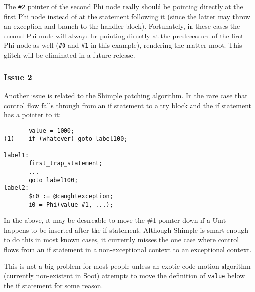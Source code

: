 \documentclass[10pt,letterpaper,oneside,onecolumn]{article}
\begin{document}
The {\tt \#2} pointer of the second Phi node really should be pointing
directly at the first Phi node instead of at the statement following
it (since the latter may throw an exception and branch to the handler
block).  Fortunately, in these cases the second Phi node will always
be pointing directly at the predecessors of the first Phi node as well
({\tt \#0} and {\tt \#1} in this example), rendering the matter moot.
This glitch will be eliminated in a future release.

\subsubsection{Issue 2}

Another issue is related to the Shimple patching algorithm.  In the
rare case that control flow falls through from an if statement to a
try block and the if statement has a pointer to it:

\begin{verbatim}
       value = 1000;
(1)    if (whatever) goto label100;

label1:
       first_trap_statement;
       ...
       goto label100;
label2:
       $r0 := @caughtexception;
       i0 = Phi(value #1, ...);
\end{verbatim}

In the above, it may be desireable to move the \#1 pointer down if a
Unit happens to be inserted after the if statement.  Although Shimple
is smart enough to do this in most known cases, it currently misses
the one case where control flows from an if statement in a
non-exceptional context to an exceptional context.

This is not a big problem for most people unless an exotic code motion
algorithm (currently non-existent in Soot) attempts to move the
definition of {\tt value} below the if statement for some reason.
\end{document}
